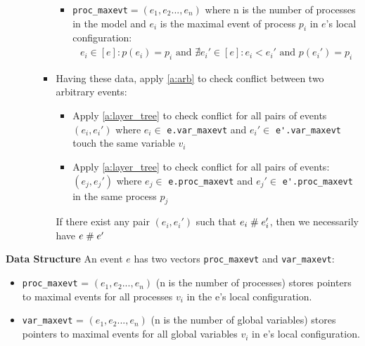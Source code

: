 \documentclass{llncs}
\begin{document}
\begin{enumerate}
\begin{itemize}
\begin{itemize}
\begin{itemize}
				\item
				\verb!proc_maxevt!$ = (e_1, e_2...,e_n)$ where  n is the number of processes in the
				model and $e_i$ is the maximal event of process $p_i$ in $e$'s local configuration:
				\begin{align}
				e_i \in  \left[ e \right]: p(e_i) = p_i \text{ and } 
				\nexists e_i' \in \left[ e \right]:
				e_i < e_i' \text{ and } p(e_i') = p_i \nonumber 
				\end{align}
				
			\end{itemize}				
			\item
			Having these data, apply \cref{a:arb} to check conflict between two arbitrary events:
			\begin{itemize}
				\item
				Apply \cref{a:layer_tree} to check conflict for all pairs of events $(e_i, e_i')$ where $e_i \in $ \verb!e.var_maxevt! 	
				and $e_i'\in $ \verb!e'.var_maxevt! touch the same variable $v_i$
				\item
				Apply \cref{a:layer_tree} to check conflict for all pairs of events: $(e_j, e_j')$ where $e_j \in $ \verb!e.proc_maxevt! 	
				and $e_j'\in $ \verb!e'.proc_maxevt! in the same process $p_j$
			\end{itemize}
			
			If there exist any pair $(e_i, e_i')$ such that $e_i \mathrel{\#} e_i'$, then we necessarily have $e \mathrel{\#} e'$			
		\end{itemize}	
	\end{itemize}
\end{enumerate}

\noindent
\textbf{Data Structure}
An event $e$ has two vectors \verb!proc_maxevt! and \verb!var_maxevt!:
\begin{itemize}
	\item
	\verb!proc_maxevt! = $(e_1, e_2...,e_n)$ (n is the number of processes) stores pointers to maximal events for all processes $v_i$ in the e's local configuration.
	\item
	\verb!var_maxevt! = $(e_1, e_2...,e_n)$ (n is the number of global variables) stores pointers to maximal events for all global variables $v_i$ in e's local configuration.	
\end{itemize}
\end{document}
